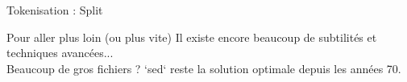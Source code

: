 \begin{frame}{Tokenisation : Split}
\end{frame}

\begin{frame}{Pour aller plus loin (ou plus vite)}
  Il existe encore beaucoup de subtilités et techniques avancées...\\
  \newline
  Beaucoup de gros fichiers ? `sed` reste la solution optimale depuis les années 70.
\end{frame}

